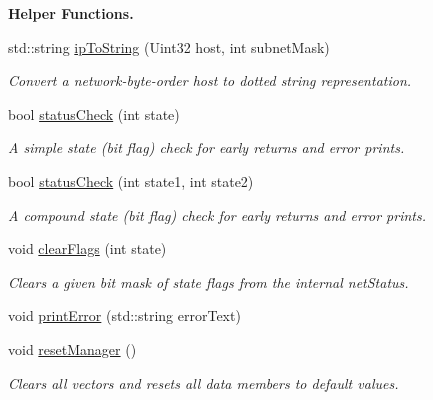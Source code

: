 \begin{Indent}{\bf Helper Functions.}\par
\begin{DoxyCompactItemize}
\item 
std\-::string \hyperlink{classNetManager_a418badaeea81703a14e51bc31b2e145f}{ip\-To\-String} (Uint32 host, int subnet\-Mask)
\begin{DoxyCompactList}\small\item\em Convert a network-\/byte-\/order host to dotted string representation. \end{DoxyCompactList}\item 
bool \hyperlink{classNetManager_a8eb8d5a292070e7269133bf1fc1499c4}{status\-Check} (int state)
\begin{DoxyCompactList}\small\item\em A simple state (bit flag) check for early returns and error prints. \end{DoxyCompactList}\item 
bool \hyperlink{classNetManager_aa5616571aa520977c221d8a8a6471a1f}{status\-Check} (int state1, int state2)
\begin{DoxyCompactList}\small\item\em A compound state (bit flag) check for early returns and error prints. \end{DoxyCompactList}\item 
void \hyperlink{classNetManager_a9f55bdec9b5c974d26354e680aa48d1e}{clear\-Flags} (int state)
\begin{DoxyCompactList}\small\item\em Clears a given bit mask of state flags from the internal net\-Status. \end{DoxyCompactList}\item 
void \hyperlink{classNetManager_af47665c6082b5f038350dcf4610929bf}{print\-Error} (std\-::string error\-Text)
\item 
void \hyperlink{classNetManager_a60e404905712ff726f1a4f0e2542d06c}{reset\-Manager} ()
\begin{DoxyCompactList}\small\item\em Clears all vectors and resets all data members to default values. \end{DoxyCompactList}\end{DoxyCompactItemize}
\end{Indent}

